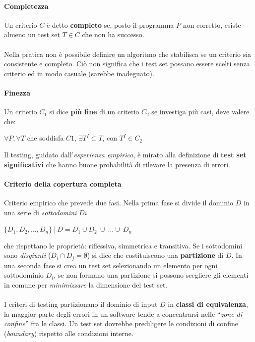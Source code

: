 \paragraph{Completezza} Un criterio $C$ è detto \textbf{completo} se, posto il programma $P$ non corretto, esiste almeno un test set $T \in C$ che non ha successo.
\\
\\
Nella pratica non è possibile definire un algoritmo che stabilisca se un criterio sia consistente e completo. Ciò non significa che i test set possano essere scelti senza criterio ed in modo casuale (sarebbe inadeguato).

\paragraph{Finezza} Un criterio $C_1$ si dice \textbf{più fine} di un criterio $C_2$ se investiga più casi, deve valere che:
\begin{center}
    $\forall P, \forall T$ che soddisfa $C1$, $\exists T^I \subset T$, con $T^I \in C_2$
\end{center}
Il testing, guidato dall'\textit{esperienza empirica}, è mirato alla definizione di \textbf{test set significativi} che hanno buone probabilità di rilevare la presenza di errori.

\paragraph{Criterio della copertura completa} Criterio empirico che prevede due fasi. Nella prima fase si divide il dominio $D$ in una serie di \textit{sottodomini} $Di$
\begin{center}
    $\{D_1, D_2, … ,D_n\}\ |\ D = D_1 \cup D_2\ \cup\ ... \cup\ D_n$
\end{center}
che rispettano le proprietà: riflessiva, simmetrica e transitiva.
Se i sottodomini sono \textit{disgiunti} ($D_i \cap D_j = \emptyset$) si dice che costituiscono una \textbf{partizione} di $D$. In una seconda fase si crea un test set selezionando un elemento per ogni sottodominio $D_i$, se non formano una partizione si possono scegliere gli elementi in comune per \textit{minimizzare} la dimensione del test set.
\\
\\
I criteri di testing partizionano il dominio di input $D$ in \textbf{classi di equivalenza}, la maggior parte degli errori in un software tende a concentrarsi nelle “\textit{zone di confine}” fra le classi. Un test set dovrebbe prediligere le condizioni di confine (\textit{boundary}) rispetto alle condizioni interne.

